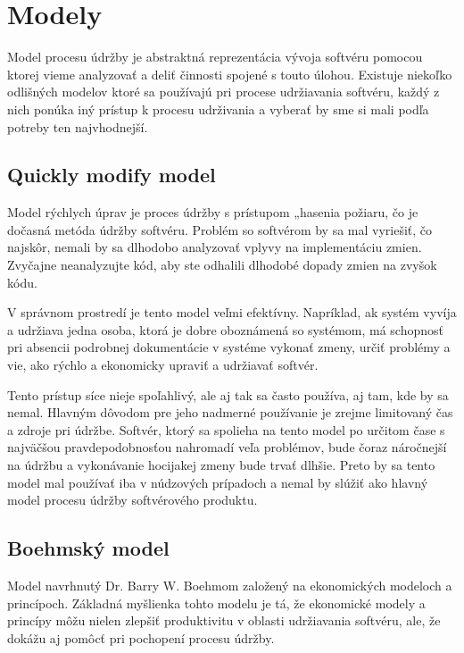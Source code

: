 \documentclass[10pt,twoside,slovak,a4paper]{article}
\begin{document}
\section{Modely} \label{modely}
Model procesu údržby je abstraktná reprezentácia vývoja softvéru pomocou ktorej vieme analyzovať a deliť činnosti spojené s touto úlohou. Existuje niekoľko odlišných modelov ktoré sa používajú pri procese udržiavania softvéru, každý z nich ponúka iný prístup k procesu udrživania a vyberať by sme si mali podľa potreby ten najvhodnejší.  \cite{6116869}

\subsection{Quickly modify model} \label{modely:quick}
Model rýchlych úprav je proces údržby s prístupom „hasenia požiaru, čo je dočasná metóda údržby softvéru. Problém so softvérom by sa mal vyriešiť, čo najskôr, nemali by sa dlhodobo analyzovať vplyvy na implementáciu zmien. Zvyčajne neanalyzujte kód, aby ste odhalili dlhodobé dopady zmien na zvyšok kódu.\cite{6116869}

V správnom prostredí je tento model veľmi efektívny. Napríklad, ak systém vyvíja a udržiava jedna osoba, ktorá je dobre oboznámená so systémom, má schopnosť pri absencii podrobnej dokumentácie v systéme vykonať zmeny, určiť problémy a vie, ako rýchlo a ekonomicky upraviť a udržiavať softvér.\cite{6116869}

Tento prístup síce nieje spoľahlivý, ale aj tak sa často používa, aj tam, kde by sa nemal. Hlavným dôvodom pre jeho nadmerné používanie je zrejme limitovaný čas a zdroje pri údržbe. Softvér, ktorý sa spolieha na tento model po určitom čase s najväčšou pravdepodobnosťou nahromadí veľa problémov, bude čoraz náročnejší na údržbu a vykonávanie hocijakej zmeny bude trvať dlhšie. Preto by sa tento model mal používať iba v núdzových prípadoch a nemal by slúžiť ako hlavný model procesu údržby softvérového produktu.\cite{6116869}

\subsection{Boehmský model} \label{modely:boehm}
Model navrhnutý Dr. Barry W. Boehmom založený na ekonomických modeloch a princípoch. Základná myšlienka tohto modelu je tá, že ekonomické modely a princípy môžu nielen zlepšiť produktivitu v oblasti udržiavania softvéru, ale, že dokážu aj pomôcť pri pochopení procesu údržby.\cite{6116869}
\end{document}

